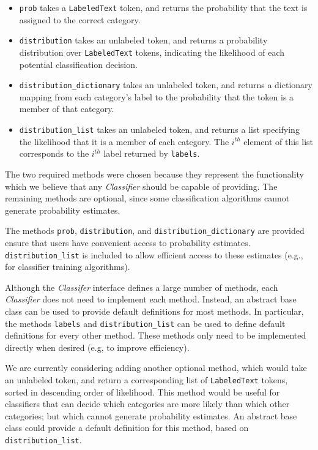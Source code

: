 \documentclass[12pt]{article}
\begin{document}
    \begin{itemize}

      \item \texttt{prob} takes a \texttt{LabeledText} token, and
      returns the probability that the text is assigned to the correct
      category.

      \item \texttt{distribution} takes an unlabeled token, and
      returns a probability distribution over \texttt{LabeledText}
      tokens, indicating the likelihood of each potential
      classification decision.

      \item \texttt{distribution\_dictionary} takes an unlabeled token,
      and returns a dictionary mapping from each category's label to
      the probability that the token is a member of that category.

      \item \texttt{distribution\_list} takes an unlabeled token, and
      returns a list specifying the likelihood that it is a member of
      each category.  The $i^{th}$ element of this list corresponds to
      the $i^{th}$ label returned by \texttt{labels}.
    \end{itemize}

    The two required methods were chosen because they represent the
    functionality which we believe that any \textit{Classifier} should be
    capable of providing.  The remaining methods are optional, since
    some classification algorithms cannot generate probability
    estimates.

    The methods \texttt{prob}, \texttt{distribution}, and
    \texttt{distribution\_dictionary} are provided ensure that users
    have convenient access to probability estimates.
    \texttt{distribution\_list} is included to allow efficient access
    to these estimates (e.g., for classifier training algorithms).

    Although the \textit{Classifer} interface defines a large number
    of methods, each \textit{Classifier} does not need to implement
    each method.  Instead, an abstract base class can be used to
    provide default definitions for most methods.  In particular, the
    methods \texttt{labels} and \texttt{distribution\_list} can be used
    to define default definitions for every other method.  These
    methods only need to be implemented directly when desired (e.g, to
    improve efficiency).

    We are currently considering adding another optional method, which
    would take an unlabeled token, and return a corresponding list of
    \texttt{LabeledText} tokens, sorted in descending order of
    likelihood.  This method would be useful for classifiers that can
    decide which categories are more likely than which other
    categories; but which cannot generate probability estimates.  An
    abstract base class could provide a default definition for this
    method, based on \texttt{distribution\_list}.
\end{document}
